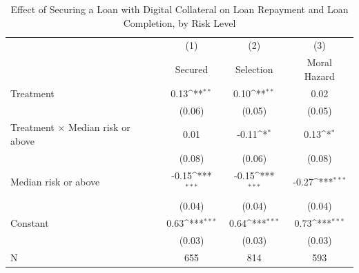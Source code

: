 \begin{table}[htbp]\centering
\def\sym#1{\ifmmode^{#1}\else\(^{#1}\)\fi}
\caption{Effect of Securing a Loan with Digital Collateral on Loan Repayment and Loan Completion, by Risk Level\label{LASMH\_repay\_riskinteract\_LATE}}
\begin{tabular}{l*{3}{c}}
\toprule
                    &\multicolumn{1}{c}{(1)}&\multicolumn{1}{c}{(2)}&\multicolumn{1}{c}{(3)}\\
                    &\multicolumn{1}{c}{Secured}&\multicolumn{1}{c}{Selection}&\multicolumn{1}{c}{Moral Hazard}\\
\midrule
Treatment           &        0.13\sym{**} &        0.10\sym{**} &        0.02         \\
                    &      (0.06)         &      (0.05)         &      (0.05)         \\\addlinespace
Treatment $\times$ Median risk or above&        0.01         &       -0.11\sym{*}  &        0.13\sym{*}  \\
                    &      (0.08)         &      (0.06)         &      (0.08)         \\\addlinespace
Median risk or above&       -0.15\sym{***}&       -0.15\sym{***}&       -0.27\sym{***}\\
                    &      (0.04)         &      (0.04)         &      (0.04)         \\\addlinespace
Constant            &        0.63\sym{***}&        0.64\sym{***}&        0.73\sym{***}\\
                    &      (0.03)         &      (0.03)         &      (0.03)         \\\addlinespace
\midrule
N                   &         655         &         814         &         593         \\
\bottomrule
\end{tabular}
\end{table}
